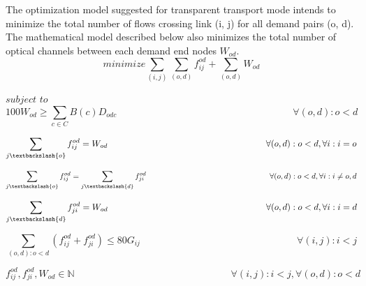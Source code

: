 The optimization model suggested for transparent transport mode intends to minimize the total number of flows crossing link (i, j) for all demand pairs (o, d). The mathematical model described below also minimizes the total number of optical channels between each demand end nodes $W_{od}$.\\

\begin{equation}
minimize    \sum_{(i,j)} \sum_{(o,d)} f_{ij}^{od} + \sum_{(o,d)} W_{od}
\label{ILPTransp_surv}
\end{equation}

$subject$ $to$
\begin{equation}
100 W_{od} \geq \sum_{c\in C} B\left(c\right) D_{odc} \qquad \qquad \qquad \qquad \qquad \qquad \qquad \qquad \qquad
\forall(o,d) : o < d
\label{ILPTransp0_surv}
\end{equation}

\begin{equation}
\sum_{j\textbackslash \{o\}} f_{ij}^{od} = W_{od}  \qquad \qquad \qquad \qquad \qquad \qquad \qquad \qquad \qquad
\forall(o,d) : o < d, \forall i: i = o
\label{ILPTransp1_surv}
\end{equation}

\begin{equation}
\sum_{j\textbackslash \{o\}} f_{ij}^{od} = \sum_{j\textbackslash \{d\}} f_{ji}^{od} \qquad \qquad \qquad \qquad \qquad \qquad \qquad \qquad
\forall(o,d) : o < d, \forall i: i \neq o,d
\label{ILPTransp2_surv}
\end{equation}

\begin{equation}
\sum_{j\textbackslash \{d\}} f_{ji}^{od} = W_{od}  \qquad \qquad \qquad \qquad \qquad \qquad \qquad \qquad \qquad
\forall(o,d) : o < d, \forall i: i = d
\label{ILPTransp3_surv}
\end{equation}

\begin{equation}
\sum_{(o,d):o<d} \left(f_{ij}^{od} + f_{ji}^{od}\right) \leq 80 G_{ij} \qquad \qquad \qquad \qquad \qquad \qquad \qquad \qquad
\forall(i,j) : i < j
\label{ILPTransp4_surv}
\end{equation}

\begin{equation}
f_{ij}^{od} , f_{ji}^{od} , W_{od} \in \mathbb{N}   \qquad \qquad \qquad \qquad \qquad \qquad \qquad \qquad
\forall(i,j) : i < j, \forall(o,d) : o < d
\label{ILPTransp5_surv}
\end{equation}

